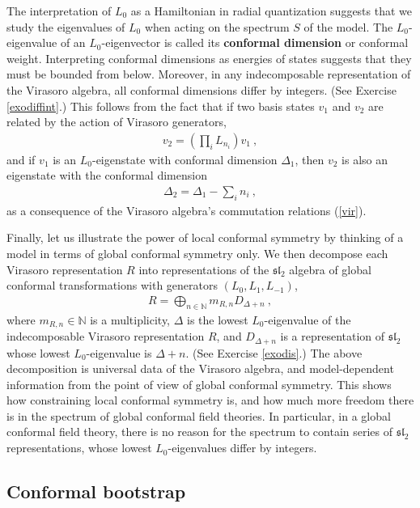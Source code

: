 \documentclass[12pt,a4paper,notitlepage]{report}
\newcommand \N {\mathbb{N}}
\numberwithin{equation}{section}
\theoremstyle{break}
\begin{document}
The interpretation of $L_0$ as a Hamiltonian in radial quantization suggests that we study the eigenvalues of $L_0$ when acting on the spectrum  $S$ of the model. The $L_0$-eigenvalue of an $L_0$-eigenvector is called its \textbf{\boldmath conformal dimension} or conformal weight. 
Interpreting conformal dimensions as energies of states suggests that they
must be bounded from below. Moreover, in any indecomposable representation of the Virasoro algebra, all conformal dimensions differ by integers. (See Exercise \ref{exodiffint}.) This follows from the fact that if 
two basis states $v_1$ and $v_2$ are related by the action of Virasoro generators,
\begin{align}
 v_2 = \left(\prod_i L_{n_i}\right) v_1\ ,
\label{vovt}
\end{align}
and if $v_1$ is an $L_0$-eigenstate with conformal dimension $\Delta_1$, then $v_2$ is also an eigenstate with the conformal dimension
\begin{align}
 \Delta_2 = \Delta_1 - \sum_i n_i\ ,
\label{ddsn}
\end{align}
as a consequence of the Virasoro algebra's commutation relations (\ref{vir}). 

Finally, let us illustrate the power of local conformal symmetry by thinking of a model in terms of global conformal symmetry only. 
We then decompose each Virasoro representation $R$ into representations of the $\mathfrak{sl}_2$ algebra of global conformal transformations with generators $(L_0,L_1,L_{-1})$,
\begin{align}
 R=\bigoplus_{n\in\N} m_{R,n} D_{\Delta+n}\ ,
\label{rbd}
\end{align}
where $m_{R,n}\in \N$ is a multiplicity, $\Delta$ is the lowest $L_0$-eigenvalue of the indecomposable Virasoro representation $R$, and $D_{\Delta+n}$ is a representation of $\mathfrak{sl}_2$ whose lowest $L_0$-eigenvalue is $\Delta+n$.
(See Exercise \ref{exodis}.)
The above decomposition is universal data of the Virasoro algebra, and 
model-dependent information from the point of view of global conformal symmetry. This shows how constraining local conformal symmetry is, and how much more freedom there is in the spectrum of global conformal field theories. In particular, in a global conformal field theory, there is no reason for the spectrum to contain series of
$\mathfrak{sl}_2$ representations, whose lowest $L_0$-eigenvalues differ by integers. 


\subsection{Conformal bootstrap}
\end{document}
